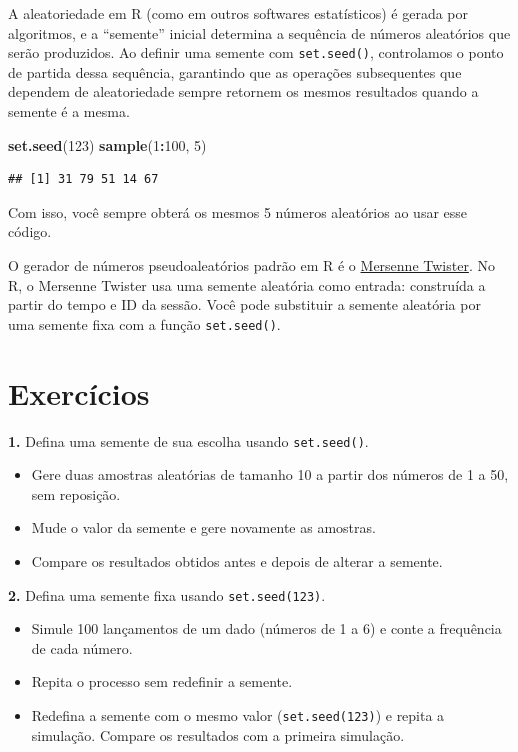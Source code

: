 \documentclass[
]{book}
\newenvironment{Shaded}{\begin{snugshade}}{\end{snugshade}}
\newcommand{\DecValTok}[1]{\textcolor[rgb]{0.00,0.00,0.81}{#1}}
\newcommand{\FunctionTok}[1]{\textcolor[rgb]{0.13,0.29,0.53}{\textbf{#1}}}
\newcommand{\NormalTok}[1]{#1}
\newcommand{\SpecialCharTok}[1]{\textcolor[rgb]{0.81,0.36,0.00}{\textbf{#1}}}
\providecommand{\tightlist}{%
  \setlength{\itemsep}{0pt}\setlength{\parskip}{0pt}}
\begin{document}
A aleatoriedade em R (como em outros softwares estatísticos) é gerada por algoritmos, e a ``semente'' inicial determina a sequência de números aleatórios que serão produzidos. Ao definir uma semente com \texttt{set.seed()}, controlamos o ponto de partida dessa sequência, garantindo que as operações subsequentes que dependem de aleatoriedade sempre retornem os mesmos resultados quando a semente é a mesma.

\begin{Shaded}
\begin{Highlighting}[]
\FunctionTok{set.seed}\NormalTok{(}\DecValTok{123}\NormalTok{)}
\FunctionTok{sample}\NormalTok{(}\DecValTok{1}\SpecialCharTok{:}\DecValTok{100}\NormalTok{, }\DecValTok{5}\NormalTok{)}
\end{Highlighting}
\end{Shaded}

\begin{verbatim}
## [1] 31 79 51 14 67
\end{verbatim}

Com isso, você sempre obterá os mesmos 5 números aleatórios ao usar esse
código.

O gerador de números pseudoaleatórios padrão em R é o \href{https://www.sciencedirect.com/science/article/abs/pii/B9780128093627500108}{Mersenne Twister}. No R, o Mersenne Twister usa uma semente aleatória como entrada: construída a partir do tempo e ID da sessão. Você pode substituir a semente aleatória por uma semente fixa com a função \texttt{set.seed()}.

\section{Exercícios}\label{exercuxedcios-22}

\textbf{1.} Defina uma semente de sua escolha usando \texttt{set.seed()}.

\begin{itemize}
\tightlist
\item
  Gere duas amostras aleatórias de tamanho 10 a partir dos números de 1 a 50, sem reposição.
\item
  Mude o valor da semente e gere novamente as amostras.
\item
  Compare os resultados obtidos antes e depois de alterar a semente.
\end{itemize}

\textbf{2.} Defina uma semente fixa usando \texttt{set.seed(123)}.

\begin{itemize}
\tightlist
\item
  Simule 100 lançamentos de um dado (números de 1 a 6) e conte a frequência de cada número.
\item
  Repita o processo sem redefinir a semente.
\item
  Redefina a semente com o mesmo valor (\texttt{set.seed(123)}) e repita a simulação. Compare os resultados com a primeira simulação.
\end{itemize}
\end{document}

